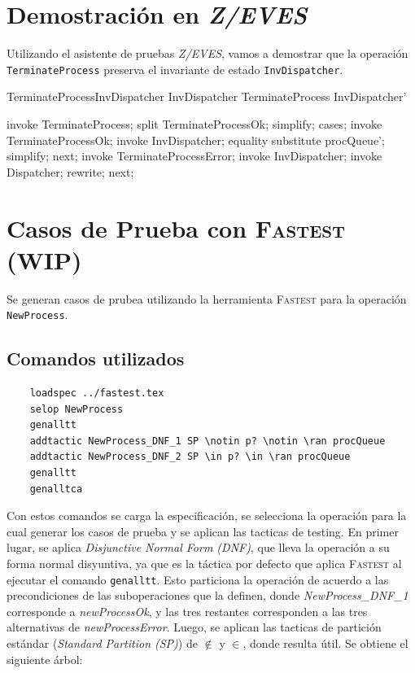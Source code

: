 \documentclass{article}
\begin{document}
\section{Demostración en \textit{Z/EVES}}

Utilizando el asistente de pruebas \textit{Z/EVES}, vamos a demostrar que la operación \verb|TerminateProcess| preserva el invariante de estado \verb|InvDispatcher|.

\begin{theorem}{TerminateProcessInvDispatcher}
    InvDispatcher \land TerminateProcess \implies InvDispatcher'
\end{theorem}

\begin{zproof}[TerminateProcessInvDispatcher]
    invoke TerminateProcess;
    split TerminateProcessOk;
    simplify;
    cases;
    invoke TerminateProcessOk;
    invoke InvDispatcher;
    equality substitute procQueue';
    simplify;
    next;
    invoke TerminateProcessError;
    invoke InvDispatcher;
    invoke \Xi Dispatcher;
    rewrite;
    next;
\end{zproof}

\section{Casos de Prueba con \textsc{Fastest} (WIP)}

Se generan casos de prubea utilizando la herramienta \textsc{Fastest} para la operación \verb|NewProcess|.

\subsection*{Comandos utilizados}

\begin{verbatim}
    loadspec ../fastest.tex
    selop NewProcess
    genalltt
    addtactic NewProcess_DNF_1 SP \notin p? \notin \ran procQueue
    addtactic NewProcess_DNF_2 SP \in p? \in \ran procQueue
    genalltt
    genalltca
\end{verbatim}

Con estos comandos se carga la especificación, se selecciona la operación para la cual generar los casos de prueba y se aplican las tacticas de testing.
En primer lugar, se aplica \textit{Disjunctive Normal Form (DNF)}, que lleva la operación a su forma normal disyuntiva, ya que es la táctica por defecto que aplica \textsc{Fastest} al ejecutar el comando \verb|genalltt|. 
Esto particiona la operación de acuerdo a las precondiciones de las suboperaciones que la definen, donde \textit{NewProcess\_DNF\_1} corresponde a \textit{newProcessOk}, y las tres restantes corresponden a las tres alternativas de \textit{newProcessError}.
Luego, se aplican las tacticas de partición estándar (\textit{Standard Partition (SP)}) de $\not\in$ y $\in$, donde resulta útil. Se obtiene el siguiente árbol:
\end{document}

